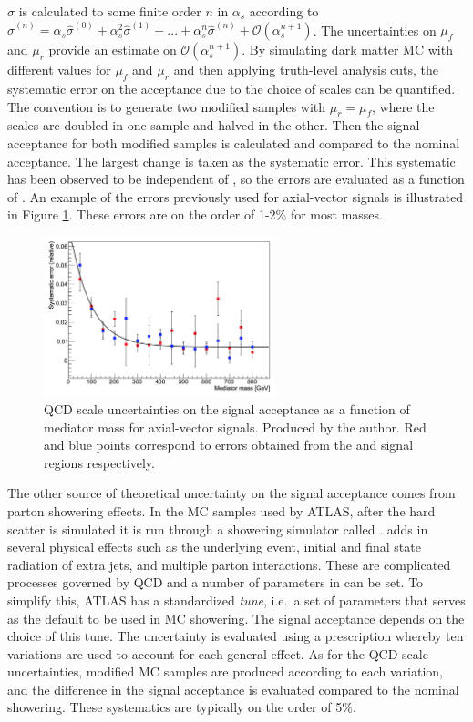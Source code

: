 $\hat{\sigma}$ is calculated to some finite order $n$ in $\alpha_s$ according to $\hat{\sigma}^{(n)} = \alpha_s \hat{\sigma}^{(0)} + \alpha_s^2 \hat{\sigma}^{(1)} + ... + \alpha_s^n \hat{\sigma}^{(n)} + \mathcal{O}(\alpha_s^{n+1})$. The uncertainties on $\mu_f$ and $\mu_r$ provide an estimate on $\mathcal{O}(\alpha_s^{n+1})$. By simulating dark matter MC with different values for $\mu_f$ and $\mu_r$ and then applying truth-level analysis cuts, the systematic error on the acceptance due to the choice of scales can be quantified. The convention is to generate two modified samples with $\mu_r = \mu_f$, where the scales are doubled in one sample and halved in the other. Then the signal acceptance for both modified samples is calculated and compared to the nominal acceptance. The largest change is taken as the systematic error. This systematic has been observed to be independent of \mchi, so the errors are evaluated as a function of \mmed. An example of the errors previously used for axial-vector signals is illustrated in Figure \ref{fig:qcd}. These errors are on the order of 1-2\% for most masses.

\begin{figure}[htb]
\centering
\includegraphics[width=0.6\textwidth]{Figures/qcd.png}
\caption{QCD scale uncertainties on the signal acceptance as a function of mediator mass for axial-vector signals. Produced by the author. Red and blue points correspond to errors obtained from the \ee and \mm signal regions respectively.}
\label{fig:qcd}
\end{figure}

The other source of theoretical uncertainty on the signal acceptance comes from parton showering effects. In the MC samples used by ATLAS, after the hard scatter is simulated it is run through a showering simulator called \pythia \cite{Sjostrand:2014zea}. \pythia adds in several physical effects such as the underlying event, initial and final state radiation of extra jets, and multiple parton interactions. These are complicated processes governed by QCD and a number of parameters in \pythia can be set. To simplify this, ATLAS has a standardized \pythia \textit{tune}, i.e.\ a set of parameters that serves as the default to be used in MC showering. The signal acceptance depends on the choice of this tune. The uncertainty is evaluated using a prescription whereby ten variations are used to account for each general effect. As for the QCD scale uncertainties, modified MC samples are produced according to each variation, and the difference in the signal acceptance is evaluated compared to the nominal showering. These systematics are typically on the order of 5\%.


